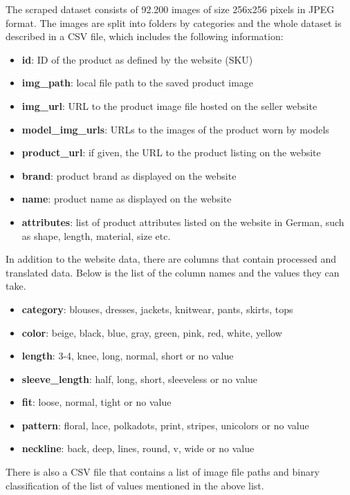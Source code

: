 \documentclass{article}
\begin{document}
The scraped dataset consists of 92.200 images of size 256x256 pixels in JPEG format. The images are split into folders by categories and the whole dataset is described in a CSV file, which includes the following information:
\begin{itemize}
\item \textbf{id}: ID of the product as defined by the website (SKU)
\item \textbf{img\_path}: local file path to the saved product image
\item \textbf{img\_url}: URL to the product image file hosted on the seller website
\item \textbf{model\_img\_urls}: URLs to the images of the product worn by models
\item \textbf{product\_url}: if given, the URL to the product listing on the website
\item \textbf{brand}: product brand as displayed on the website
\item \textbf{name}: product name as displayed on the website
\item \textbf{attributes}: list of product attributes listed on the website in German, such as shape, length, material, size etc.
\end{itemize}

In addition to the website data, there are columns that contain processed and translated data. Below is the list of the column names and the values they can take.
\begin{itemize}
\item \textbf{category}: blouses, dresses, jackets, knitwear, pants, skirts, tops
\item \textbf{color}: beige, black, blue, gray, green, pink, red, white, yellow
\item \textbf{length}: 3-4, knee, long, normal, short or no value
\item \textbf{sleeve\_length}: half, long, short, sleeveless or no value
\item \textbf{fit}: loose, normal, tight or no value
\item \textbf{pattern}: floral, lace, polkadots, print, stripes, unicolors or no value
\item \textbf{neckline}: back, deep, lines, round, v, wide or no value
\end{itemize}

There is also a CSV file that contains a list of image file paths and binary classification of the list of values mentioned in the above list.


\newpage


\end{document}

